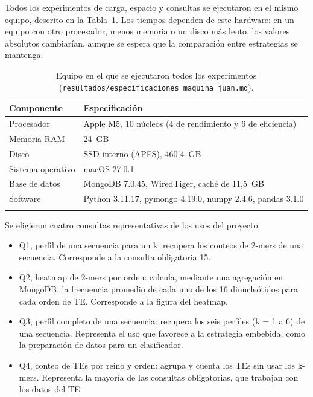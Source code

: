 \documentclass[unnumsec,namedate,webpdf,contemporary,large]{oup-authoring-template}
\begin{document}
Todos los experimentos de carga, espacio y consultas se ejecutaron en el mismo equipo, descrito en la Tabla~\ref{tab:maquina}. Los tiempos dependen de este hardware: en un equipo con otro procesador, menos memoria o un disco m\'as lento, los valores absolutos cambiar\'ian, aunque se espera que la comparaci\'on entre estrategias se mantenga.

\begin{table}[!t]
\caption{Equipo en el que se ejecutaron todos los experimentos (\texttt{resultados/especificaciones\_maquina\_juan.md}).\label{tab:maquina}}
\footnotesize
\begin{tabular*}{\columnwidth}{@{\extracolsep{\fill}}ll@{}}
\toprule
Componente & Especificaci\'on \\
\midrule
Procesador & Apple M5, 10 n\'ucleos (4 de rendimiento y 6 de eficiencia) \\
Memoria RAM & 24~GB \\
Disco & SSD interno (APFS), 460,4~GB \\
Sistema operativo & macOS 27.0.1 \\
Base de datos & MongoDB 7.0.45, WiredTiger, cach\'e de 11,5~GB \\
Software & Python 3.11.17, pymongo 4.19.0, numpy 2.4.6, pandas 3.1.0 \\
\botrule
\end{tabular*}
\end{table}

Se eligieron cuatro consultas representativas de los usos del proyecto:
\begin{itemize}
\item Q1, perfil de una secuencia para un k: recupera los conteos de 2-mers de una secuencia. Corresponde a la consulta obligatoria 15.
\item Q2, heatmap de 2-mers por orden: calcula, mediante una agregaci\'on en MongoDB, la frecuencia promedio de cada uno de los 16 dinucle\'otidos para cada orden de TE. Corresponde a la figura del heatmap.
\item Q3, perfil completo de una secuencia: recupera los seis perfiles (k = 1 a 6) de una secuencia. Representa el uso que favorece a la estrategia embebida, como la preparaci\'on de datos para un clasificador.
\item Q4, conteo de TEs por reino y orden: agrupa y cuenta los TEs sin usar los k-mers. Representa la mayor\'ia de las consultas obligatorias, que trabajan con los datos del TE.
\end{itemize}
\end{document}
